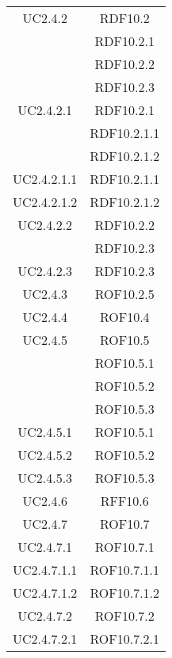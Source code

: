 \begin{longtable}{|c|c|}
\midrule
UC2.4.2
& RDF10.2\\
& RDF10.2.1\\
& RDF10.2.2\\
& RDF10.2.3\\

\midrule
UC2.4.2.1
& RDF10.2.1\\
& RDF10.2.1.1\\
& RDF10.2.1.2\\

\midrule
UC2.4.2.1.1
& RDF10.2.1.1\\

\midrule
UC2.4.2.1.2
& RDF10.2.1.2\\

\midrule
UC2.4.2.2
& RDF10.2.2\\
& RDF10.2.3\\

\midrule
UC2.4.2.3
& RDF10.2.3\\

\midrule
UC2.4.3
& ROF10.2.5\\

\midrule
UC2.4.4
& ROF10.4\\

\midrule
UC2.4.5
& ROF10.5\\
& ROF10.5.1\\
& ROF10.5.2\\
& ROF10.5.3\\

\midrule
UC2.4.5.1
& ROF10.5.1\\

\midrule
UC2.4.5.2
& ROF10.5.2\\

\midrule
UC2.4.5.3
& ROF10.5.3\\

\midrule
UC2.4.6
& RFF10.6\\

\midrule
UC2.4.7
& ROF10.7\\

\midrule
UC2.4.7.1
& ROF10.7.1\\

\midrule
UC2.4.7.1.1
& ROF10.7.1.1\\

\midrule
UC2.4.7.1.2
& ROF10.7.1.2\\

\midrule
UC2.4.7.2
& ROF10.7.2\\

\midrule
UC2.4.7.2.1
& ROF10.7.2.1\\


\end{longtable}
